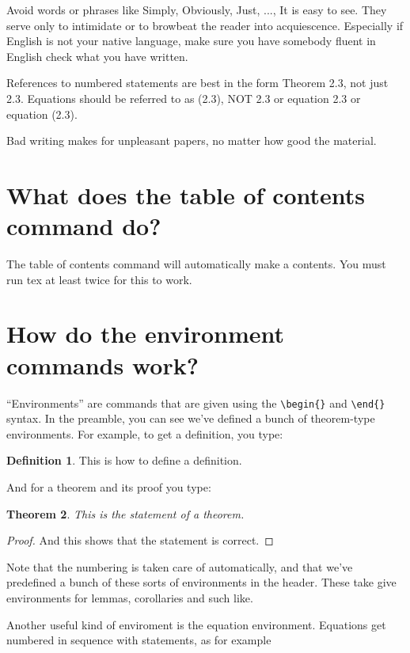 \documentclass[psamsfonts]{amsart}
\newtheorem{thm}{Theorem}[section]
\theoremstyle{definition}
\newtheorem{defn}[thm]{Definition}
\theoremstyle{remark}
\numberwithin{equation}{section}
\begin{document}
Avoid words or phrases like Simply, Obviously, Just, ..., It is easy to see.  They serve only to intimidate or to browbeat the reader into acquiescence. 
Especially if English is not your native language, make sure you have  somebody fluent in English check what you have written.     

References to numbered statements are best in the form Theorem 2.3, not just 2.3.
Equations should be referred to as (2.3), NOT 2.3 or equation 2.3 or equation (2.3).


Bad writing makes for unpleasant papers, no matter how good the material.


\section{What does the table of contents command do?}

The table of contents command will automatically make a contents.
You must run tex at least twice for this to work.

\section{How do the environment commands work?}

``Environments'' are commands that are given using the \verb|\begin{}|
  and \verb|\end{}| syntax. In the preamble, you can see we've defined
  a bunch of theorem-type environments.  For example, to get a definition, 
you type:

\begin{defn}  This is how to define a definition.
\end{defn}

And for a theorem and its proof you type:

\begin{thm}
This is the statement of a theorem.
\end{thm}
\begin{proof}
And this shows that the statement is correct.
\end{proof}

Note that the numbering is taken care of automatically, and that we've predefined a bunch of these sorts of environments in the header.  These take give environments for  lemmas, corollaries and such like. 

Another useful kind of enviroment is the equation environment.  Equations
get numbered in sequence with statements, as for example
\end{document}
